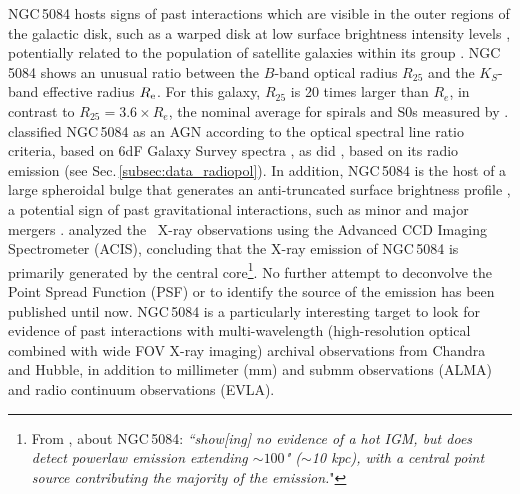 \documentclass[modern]{CORE-AAS/aastex631}
\begin{document}
NGC\,5084 hosts signs of past interactions which are visible in the outer regions of the galactic disk, such as a warped disk at low surface brightness intensity levels \citep{zeilinger+1990mnras246_324}, potentially related to the population of satellite galaxies within its group \citep{carignan+1997aj113_1585}. NGC\,5084 shows an unusual ratio between the $B$-band optical radius $R_{25}$ and the $K_S$-band
effective radius $R_{\rm e}$. For this galaxy, $R_{25}$ is 20 times larger than $R_e$, in contrast to $R_{25}=3.6 \times R_e$, the nominal average for spirals and S0s measured by  \citet[][]{williams+2009mnras400_1665}.  \citet{zaw+2019apj872_134} classified NGC\,5084 as an AGN according to the \citet{kewley+2001apj556_121} optical spectral line ratio criteria, based on 6dF Galaxy Survey spectra \citep{jones+2004mnras355_747,jones+2009mnras399_683}, as did \citet{irwin+2019aj158_21}, based on its radio emission (see Sec.\,\ref{subsec:data_radiopol}). In addition, NGC\,5084 is the host of a large spheroidal bulge that generates an anti-truncated surface brightness profile \citep{comeron+2012apj759_98}, a potential sign of past gravitational interactions, such as minor and major mergers \citep{younger+2007apj670_269, borlaff+2014aap570_103}.
\citet{osullivan+2017mnras472_1482} analyzed the \Chandra\ X-ray observations using the Advanced CCD Imaging Spectrometer (ACIS), concluding that the X-ray emission of NGC\,5084 is primarily generated by the central core\footnote{From \citet{osullivan+2017mnras472_1482}, about NGC\,5084: \emph{``show[ing] no evidence of a hot IGM, but does detect powerlaw emission extending $\sim100$" ($\sim$10 kpc), with a central point
source contributing the majority of the emission.}"}. No further attempt to deconvolve the Point Spread Function (PSF) or to identify the source of the emission has been published until now.  NGC\,5084 is a particularly interesting target to look for evidence of past interactions with multi-wavelength (high-resolution optical combined with wide FOV X-ray imaging) archival observations from Chandra and Hubble, in addition to millimeter (mm) and submm observations (ALMA) and radio continuum observations (EVLA). 
\end{document}
